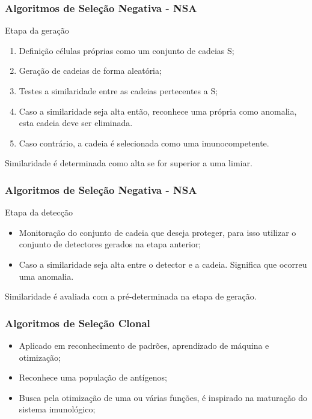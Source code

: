 \documentclass{beamer}
\begin{document}
\begin{frame}
    \frametitle{Algoritmos de Seleção Negativa - NSA}
    
    Etapa da geração \cite{decastro2002}
    
    \begin{enumerate}
        \item Definição células próprias como um conjunto de cadeias S; 
        \item Geração de cadeias de forma aleatória; 
        \item Testes a similaridade entre as cadeias pertecentes a S;
        \item Caso a similaridade seja alta então, reconhece uma própria como anomalia, esta cadeia deve ser eliminada.
        \item Caso contrário, a cadeia é selecionada como uma imunocompetente.
    \end{enumerate}
    Similaridade é determinada como alta se for superior a uma limiar.
\end{frame}

\begin{frame}
    \frametitle{Algoritmos de Seleção Negativa - NSA}
    
    Etapa da detecção \cite{decastro2002}
    
    \begin{itemize}
        \item Monitoração do conjunto de cadeia que deseja proteger, para isso utilizar o conjunto de detectores gerados na etapa anterior;
        \item Caso a similaridade seja alta entre o detector e a cadeia. Significa que ocorreu uma anomalia. 
    \end{itemize}
    Similaridade é avaliada com a pré-determinada na etapa de geração.
\end{frame}

\begin{frame}
    \frametitle{Algoritmos de Seleção Clonal}
    
    \begin{itemize}
        \item Aplicado em reconhecimento de padrões, aprendizado de máquina e otimização;
        \item Reconhece uma população de antígenos;
        \item Busca pela otimização de uma ou várias funções, é inspirado na maturação do sistema imunológico;
    \end{itemize}
\end{frame}
\end{document}
